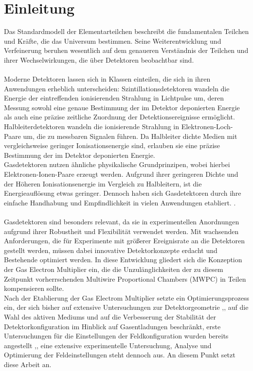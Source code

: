 \chapter{Einleitung}


\noindent Das Standardmodell der Elementarteilchen beschreibt die fundamentalen Teilchen und Kräfte, die das Universum bestimmen. Seine Weiterentwicklung und Verfeinerung beruhen wesentlich auf dem genaueren Verständnis der Teilchen und ihrer Wechselwirkungen, die über Detektoren beobachtbar sind.\\
\\
Moderne Detektoren lassen sich in Klassen einteilen, die sich in ihren Anwendungen erheblich unterscheiden: Szintillationsdetektoren wandeln die Energie der eintreffenden ionisierenden Strahlung in Lichtpulse um, deren Messung sowohl eine genaue Bestimmung der im Detektor deponierten Energie als auch eine präzise zeitliche Zuordnung der Detektionsereignisse ermöglicht.\\
Halbleiterdetektoren wandeln die ionisierende Strahlung in Elektronen-Loch-Paare um, die zu messbaren Signalen führen. Da Halbleiter dichte Medien mit vergleichsweise geringer Ionisationsenergie sind, erlauben sie eine präzise Bestimmung der im Detektor deponierten Energie.\\
Gasdetektoren nutzen ähnliche physikalische Grundprinzipen, wobei hierbei Elektronen-Ionen-Paare erzeugt werden. Aufgrund ihrer geringeren Dichte und der Höheren Ionisationsenergie im Vergleich zu Halbleitern, ist die Energieauflösung etwas geringer. Dennoch haben sich Gasdetektoren durch ihre einfache Handhabung und Empfindlichkeit in vielen Anwendungen etabliert.  \cite{Leo}.\\
\\
Gasdetektoren sind besonders relevant, da sie in experimentellen Anordnungen aufgrund ihrer Robustheit und Flexibilität verwendet werden. Mit wachsenden Anforderungen, die für Experimente mit größerer Ereignisrate an die Detektoren gestellt werden, müssen dabei innovative Detektorkonzepte erdacht und Bestehende optimiert werden. In diese Entwicklung gliedert sich die Konzeption der Gas Electron Multiplier ein, die die Unzulänglichkeiten der zu diesem Zeitpunkt vorherrschenden Multiwire Proportional Chambers (MWPC) \cite{Sauli_Multiwire} \cite{GEM_Introduction} in Teilen kompensieren sollte. \\
Nach der Etablierung der Gas Electrom Multiplier setzte ein Optimierungsprozess ein, der sich bisher auf extensive Untersuchungen zur Detektorgeometrie \cite{BUTTNER},\cite{Bachmann}, auf die Wahl des aktiven Mediums \cite{GAS_MIX} und auf die Verbesserung der Stabilität der Detektorkonfiguration im Hinblick auf Gasentladungen \cite{Stabilitaet_Discharge} beschränkt, erste Untersuchungen für die Einstellungen  der Feldkonfiguration wurden bereits angestellt \cite{Bachmann},\cite{ottnad}, eine extensive experimentelle Untersuchung, Analyse und Optimierung der Feldeinstellungen steht dennoch aus. An diesem Punkt setzt diese Arbeit an.\\
